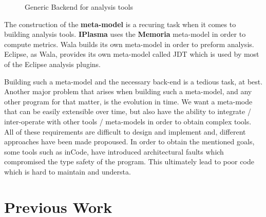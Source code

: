         \begin{figure}
        \centering
        \caption{Generic Backend for analysis tools \cite{paper:xcore}}
        \label{fig:analysisArchitecture}
        \end{figure}

        The construction of the \textbf{meta-model} is a recuring task when it comes to building analysis tools. \textbf{IPlasma} \cite{tools:iPlasma} uses the \textbf{Memoria}
meta-model in order to compute metrics. Wala \cite{tools:wala} builds its own meta-model in order to preform analysis. Eclipse, as Wala, provides its own meta-model called JDT
\cite{tools:JDT} which is used by most of the Eclipse analysis plugins. 
        
        Building such a meta-model and the necessary back-end is a tedious task, at best. Another major problem that arises when building such a meta-model, and any other program
for that matter, is the evolution in time. We want a meta-mode that can be easily extensible over time, but also have the ability to integrate / inter-operate with other tools / meta-models
in order to obtain complex tools. All of these requirements are difficult to design and implement and, different approaches have been made propoused.\cite{tools:fame} \cite{paper:xcore}
        In order to obtain the mentioned goals, some tools such as inCode\cite{tools:inCode}, have introduced architectural faults which compromised the type safety of the program. This
ultimately lead to poor code which is hard to maintain and understa. \cite{oldThesis}

\section{Previous Work}


